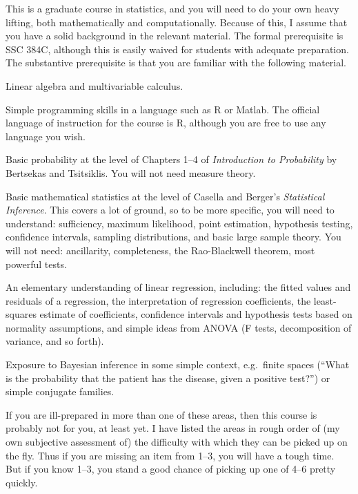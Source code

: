 \documentclass{mynotes}
\begin{document}
This is a graduate course in statistics, and you will need to do your own heavy lifting, both mathematically and computationally.  Because of this, I assume that you have a solid background in the relevant material.  The formal prerequisite is SSC 384C, although this is easily waived for students with adequate preparation.  The substantive prerequisite is that you are familiar with the following material.
\begin{compactenum}[(1)]
\item Linear algebra and multivariable calculus.
\item Simple programming skills in a language such as R or Matlab.  The official language of instruction for the course is R, although you are free to use any language you wish.
\item Basic probability at the level of Chapters 1--4 of \textit{Introduction to Probability} by Bertsekas and Tsitsiklis.  You will not need measure theory.
\item Basic mathematical statistics at the level of Casella and Berger's \textit{Statistical Inference}.  This covers a lot of ground, so to be more specific, you will need to understand: sufficiency, maximum likelihood, point estimation, hypothesis testing, confidence intervals, sampling distributions, and basic large sample theory.  You will not need: ancillarity, completeness, the Rao-Blackwell theorem, most powerful tests.
\item An elementary understanding of linear regression, including: the fitted values and residuals of a regression, the interpretation of regression coefficients, the least-squares estimate of coefficients, confidence intervals and hypothesis tests based on normality assumptions, and simple ideas from ANOVA (F tests, decomposition of variance, and so forth).\
\item Exposure to Bayesian inference in some simple context, e.g.~finite spaces (``What is the probability that the patient has the disease, given a positive test?'') or simple conjugate families.
\end{compactenum}

If you are ill-prepared in more than one of these areas, then this course is probably not for you, at least yet.  I have listed the areas in rough order of (my own subjective assessment of) the difficulty with which they can be picked up on the fly.  Thus if you are missing an item from 1--3, you will have a tough time.  But if you know 1--3, you stand a good chance of picking up one of 4--6 pretty quickly.
\end{document}
